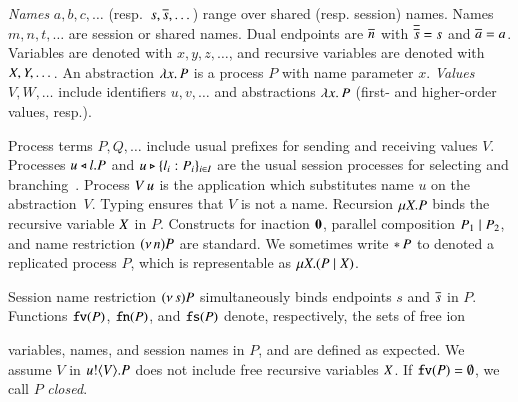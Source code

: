 \documentclass[preprint,11pt]{elsarticle}
\begin{document}
{%
\emph{Names} $a,b,c, \dots$ (resp.~$s, \overline{s}, \dots$) 
range over shared (resp. session) names. 
Names $m, n, t, \dots$ are session or shared names.
Dual endpoints are $\overline{n}$ with
$\overline{\overline{s}} = s$ and $\overline{a} = a$.
Variables are denoted with $x, y, z, \dots$, 
and recursive variables are denoted with $X, Y, \dots$.
An abstraction %
$\lambda x.\,P$ is a process $P$ with name parameter $x$.
\emph{Values} $V,W, \ldots$ include 
identifiers $u, v, \ldots$ %
and 
abstractions $\lambda x.\,P$ (first- and higher-order values, resp.). 


Process terms $P, Q, \ldots$ 
include usual %
prefixes for sending and receiving values $V$.
Processes $u \triangleleft l . P$ and $u \triangleright \{l_i: P_i\}_{i \in I}$ are the
usual session processes for selecting and branching~\cite{honda.vasconcelos.kubo:language-primitives}.
Process 
$V\, {u}$ 
is the application
which substitutes name $u$ on the abstraction~$V$. 
Typing  ensures that $V$ is not a name.
Recursion   $\mu X. P$ binds the recursive variable $X$ in   $P$.
Constructs for 
inaction $\mathbf{0}$,  parallel composition $P_1 \;|\; P_2$, and 
name restriction $(\nu\, n) P$ are standard.
We sometimes write $\ast\,{} P$ to denoted a replicated process $P$, which is representable as $\mu X. (P \;|\; X)$. 

Session name restriction $(\nu\, s) P$ simultaneously binds endpoints $s$ and $\overline{s}$ in $P$.
Functions $\mathtt{fv}(P)$, $\mathtt{fn}(P)$, and $\mathtt{fs}(P)$ denote, respectively, the sets of free 
ion}
variables, names, and session names in $P$, and are defined as expected.
We assume $V$ in $u ! \langle V \rangle .{P}$ does not include free recursive 
variables $X$.
If $\mathtt{fv}(P) = \emptyset$, we call $P$ {\em closed}.
\end{document}
